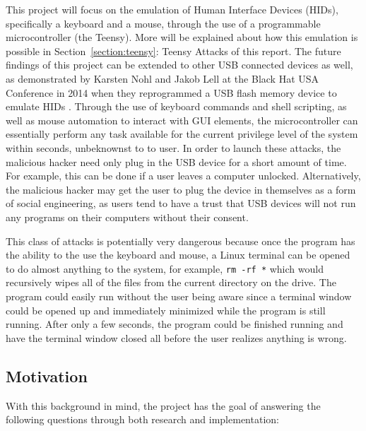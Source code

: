 \documentclass[pagenumbers]{ieee}
\begin{document}
This project will focus on the emulation of Human Interface Devices (HIDs), specifically a keyboard and a mouse, through the use of a programmable microcontroller (the Teensy). More will be explained about how this emulation is possible in Section~\ref{section:teensy}: Teensy Attacks of this report. The future findings of this project can be extended to other USB connected devices as well, as demonstrated by Karsten Nohl and Jakob Lell at the Black Hat USA Conference in 2014 when they reprogrammed a USB flash memory device to emulate HIDs \cite{nohl}. Through the use of keyboard commands and shell scripting, as well as mouse automation to interact with GUI elements, the microcontroller can essentially perform any task available for the current privilege level of the system within seconds, unbeknownst to to user. In order to launch these attacks, the malicious hacker need only plug in the USB device for a short amount of time. For example, this can be done if a user leaves a computer unlocked. Alternatively, the malicious hacker may get the user to plug the device in themselves as a form of social engineering, as users tend to have a trust that USB devices will not run any programs on their computers without their consent.

This class of attacks is potentially very dangerous because once the program has the ability to the use the keyboard and mouse, a Linux terminal can be opened to do almost anything to the system, for example, \texttt{rm -rf *} which would recursively wipes all of the files from the current directory on the drive. The program could easily run without the user being aware since a terminal window could be opened up and immediately minimized while the program is still running. After only a few seconds, the program could be finished running and have the terminal window closed all before the user realizes anything is wrong.


\subsection{Motivation}
\label{section:motivation}

With this background in mind, the project has the goal of answering the following questions through both research and implementation:
\end{document}
